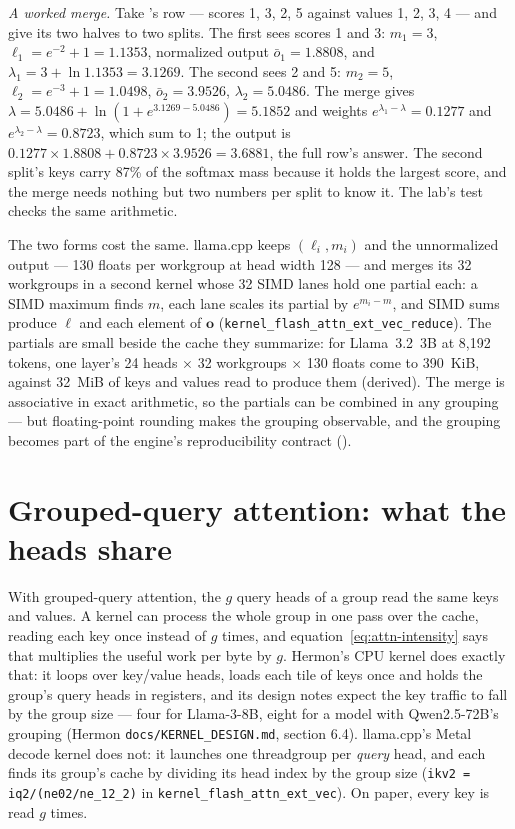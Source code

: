 \emph{A worked merge.} Take 's row --- scores 1, 3, 2, 5
against values 1, 2, 3, 4 --- and give its two halves to two splits. The first
sees scores 1 and 3: $m_1 = 3$, $\ell_1 = e^{-2} + 1 = 1.1353$, normalized output
$\bar{o}_1 = 1.8808$, and $\lambda_1 = 3 + \ln 1.1353 = 3.1269$. The second sees 2
and 5: $m_2 = 5$, $\ell_2 = e^{-3} + 1 = 1.0498$, $\bar{o}_2 = 3.9526$,
$\lambda_2 = 5.0486$. The merge gives $\lambda = 5.0486 + \ln(1 + e^{3.1269 -
5.0486}) = 5.1852$ and weights $e^{\lambda_1 - \lambda} = 0.1277$ and
$e^{\lambda_2 - \lambda} = 0.8723$, which sum to 1; the output is
$0.1277 \times 1.8808 + 0.8723 \times 3.9526 = 3.6881$, the full row's answer.
The second split's keys carry 87\% of the softmax mass because it holds the
largest score, and the merge needs nothing but two numbers per split to know
it. The lab's test checks the same arithmetic.

The two forms cost the same. llama.cpp keeps $(\ell_i, m_i)$ and the unnormalized
output --- 130 floats per workgroup at head width 128 --- and merges its 32
workgroups in a second kernel whose 32 SIMD lanes hold one partial each: a
SIMD maximum finds $m$, each lane scales its partial by $e^{m_i - m}$, and SIMD
sums produce $\ell$ and each element of $\mathbf{o}$
(\texttt{kernel\_flash\_attn\_ext\_vec\_reduce}). The partials are small beside
the cache they summarize: for Llama~3.2~3B at 8,192 tokens, one layer's 24 heads
$\times$ 32 workgroups $\times$ 130 floats come to 390~KiB, against 32~MiB of
keys and values read to produce them (derived). The merge is associative in
exact arithmetic, so the partials can be combined in any grouping --- but
floating-point rounding makes the grouping observable, and the grouping becomes
part of the engine's reproducibility contract ().

\section{Grouped-query attention: what the heads share}

With grouped-query attention, the $g$ query heads of a group read the same keys
and values. A kernel can process the whole group in one pass over the cache,
reading each key once instead of $g$ times, and equation~\eqref{eq:attn-intensity}
says that multiplies the useful work per byte by $g$. Hermon's CPU kernel does
exactly that: it loops over key/value heads, loads each tile of keys once and
holds the group's query heads in registers, and its design notes expect the
key traffic to fall by the group size --- four for Llama-3-8B, eight for a model
with Qwen2.5-72B's grouping (Hermon \texttt{docs/KERNEL\_DESIGN.md}, section
6.4). llama.cpp's Metal decode kernel does not: it launches one threadgroup per
\emph{query} head, and each finds its group's cache by dividing its head index
by the group size (\texttt{ikv2 = iq2/(ne02/ne\_12\_2)} in
\texttt{kernel\_flash\_attn\_ext\_vec}). On paper, every key is read $g$ times.

